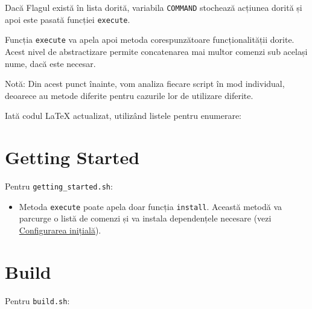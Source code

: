 Dacă Flagul există în lista dorită, variabila \texttt{COMMAND} stochează acțiunea dorită și apoi este pasată funcției \texttt{execute}.

Funcția \texttt{execute} va apela apoi metoda corespunzătoare funcționalității dorite. Acest nivel de abstractizare permite concatenarea mai multor comenzi sub același nume, dacă este necesar.

Notă: Din acest punct înainte, vom analiza fiecare script în mod individual, deoarece au metode diferite pentru cazurile lor de utilizare diferite.

Iată codul LaTeX actualizat, utilizând listele pentru enumerare:

\section{Getting Started}
Pentru \texttt{getting\_started.sh}:

\begin{itemize}
    \item Metoda \texttt{execute} poate apela doar funcția \texttt{install}. Această metodă va parcurge o listă de comenzi și va instala dependențele necesare (vezi \hyperref[first-time-setup]{Configurarea inițială}).
\end{itemize}

\section{Build}
Pentru \texttt{build.sh}:

